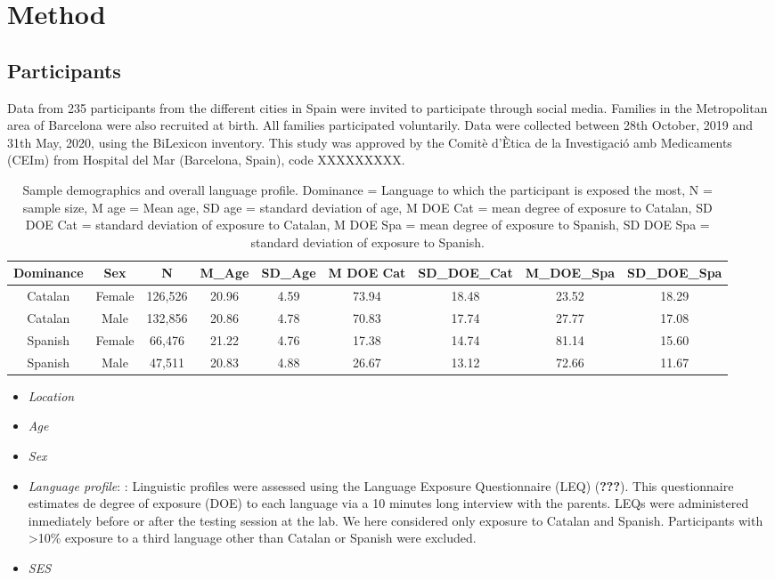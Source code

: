 \documentclass[english,man,man,floatsintext]{apa6}
\providecommand{\tightlist}{%
  \setlength{\itemsep}{0pt}\setlength{\parskip}{0pt}}
\begin{document}
\hypertarget{method}{%
\section{Method}\label{method}}

\hypertarget{participants}{%
\subsection{Participants}\label{participants}}

Data from 235 participants from the different cities in Spain were invited to participate through social media. Families in the Metropolitan area of Barcelona were also recruited at birth. All families participated voluntarily. Data were collected between 28th October, 2019 and 31th May, 2020, using the BiLexicon inventory. This study was approved by the Comitè d'Ètica de la Investigació amb Medicaments (CEIm) from Hospital del Mar (Barcelona, Spain), code XXXXXXXXX.

\begin{table}

\caption{\label{tab:participants}Sample demographics and overall language profile. Dominance = Language to which the participant is exposed the most, N = sample size, M age = Mean age, SD age = standard deviation of age, M DOE Cat = mean degree of exposure to Catalan, SD DOE Cat = standard deviation of exposure to Catalan, M DOE Spa = mean degree of exposure to Spanish, SD DOE Spa = standard deviation of exposure to Spanish.}
\centering
\begin{tabular}[t]{c|c|c|c|c|c|c|c|c}
\hline
Dominance & Sex & N & M\_Age & SD\_Age & M DOE Cat & SD\_DOE\_Cat & M\_DOE\_Spa & SD\_DOE\_Spa\\
\hline
Catalan & Female & 126,526 & 20.96 & 4.59 & 73.94 & 18.48 & 23.52 & 18.29\\
\hline
Catalan & Male & 132,856 & 20.86 & 4.78 & 70.83 & 17.74 & 27.77 & 17.08\\
\hline
Spanish & Female & 66,476 & 21.22 & 4.76 & 17.38 & 14.74 & 81.14 & 15.60\\
\hline
Spanish & Male & 47,511 & 20.83 & 4.88 & 26.67 & 13.12 & 72.66 & 11.67\\
\hline
\end{tabular}
\end{table}

\begin{itemize}
\tightlist
\item
  \emph{Location}
\item
  \emph{Age}
\item
  \emph{Sex}
\item
  \emph{Language profile}: : Linguistic profiles were assessed using the Language Exposure Questionnaire (LEQ) ({\textbf{???}}). This questionnaire estimates de degree of exposure (DOE) to each language via a 10 minutes long interview with the parents. LEQs were administered inmediately before or after the testing session at the lab. We here considered only exposure to Catalan and Spanish. Participants with \textgreater{}10\% exposure to a third language other than Catalan or Spanish were excluded.
\item
  \emph{SES}
\end{itemize}
\end{document}
